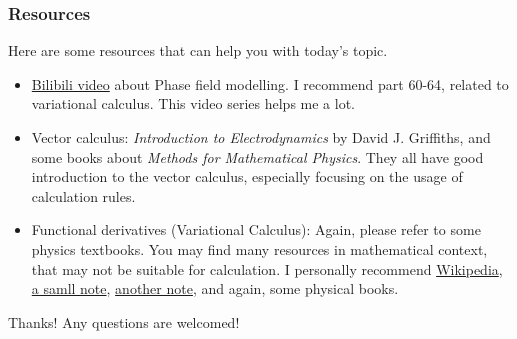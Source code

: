 \documentclass[compress]{beamer}
\begin{document}
\begin{frame}
  \frametitle{Resources}
  Here are some resources that can help you with today's topic.
  \begin{itemize}
    \item \href{https://www.bilibili.com/video/BV1oC4y147CU/}{\color{blue}Bilibili video} about Phase field modelling. I recommend part 60-64, related to variational
          calculus. This video series helps me a lot.
    \item Vector calculus: \emph{Introduction to Electrodynamics} by David J. Griffiths, and some books about \emph{Methods for Mathematical Physics}. They all have good
          introduction to the vector calculus, especially focusing on the usage of calculation rules.
    \item Functional derivatives (Variational Calculus): Again, please refer to some physics textbooks. You may find many resources in mathematical context,
          that may not be suitable for calculation. I personally recommend
          \href{https://en.wikipedia.org/wiki/Functional_derivative}{\color{blue}Wikipedia},
          \href{https://physicspages.com/pdf/Field\%20theory/Functional\%20derivatives\%20-\%20more\%20examples.pdf}{\color{blue}a samll note},
          \href{https://www.jiaxuanli.me/Homepage/doc/Mathematical_Method/chpp20.pdf}{\color{blue}another note}, and again, some physical books.
  \end{itemize}
\end{frame}

\begin{frame}
  \begin{center}
    {\Huge \calligra Thanks!}
    \bigbreak
    {\huge Any questions are welcomed!}
  \end{center}
\end{frame}
\end{document}

